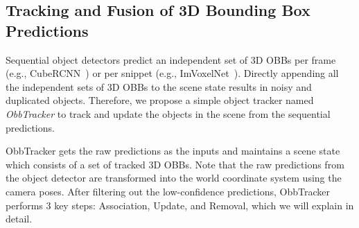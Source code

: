 

\subsection{Tracking and Fusion of 3D Bounding Box Predictions}

Sequential object detectors predict an independent set of 3D OBBs per frame (e.g., CubeRCNN~\cite{Brazil_2023_CVPR}) or per snippet (e.g., ImVoxelNet~\cite{rukhovich2022imvoxelnet}). Directly appending all the independent sets of 3D OBBs to the scene state results in noisy and duplicated objects. Therefore, we propose a simple object tracker named \textit{ObbTracker} to track and update the objects in the scene from the sequential predictions.

ObbTracker gets the raw predictions as the inputs and maintains a scene state which consists of a set of tracked 3D OBBs. Note that the raw predictions from the object detector are transformed into the world coordinate system using the camera poses. After filtering out the low-confidence predictions, ObbTracker performs 3 key steps: Association, Update, and Removal, which we will explain in detail.

